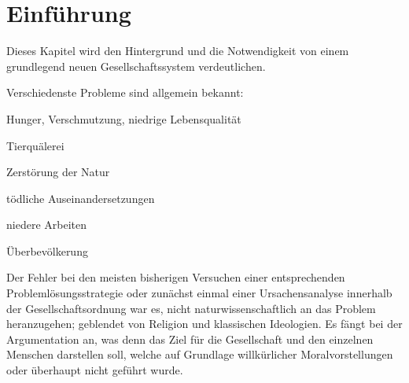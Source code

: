 \chapter{Einführung}\label{chap:introduction}

Dieses Kapitel wird den Hintergrund und die Notwendigkeit von einem grundlegend neuen Gesellschaftssystem verdeutlichen.

Verschiedenste Probleme sind allgemein bekannt:
\medskip
\begin{compactitem}
\item Hunger, Verschmutzung, niedrige Lebensqualität
\item Tierquälerei
\item Zerstörung der Natur
\item tödliche Auseinandersetzungen
\item niedere Arbeiten
\item Überbevölkerung
\end{compactitem}
\medskip

Der Fehler bei den meisten bisherigen Versuchen einer entsprechenden Problemlösungsstrategie oder zunächst einmal einer Ursachensanalyse innerhalb der Gesellschaftsordnung war es, nicht naturwissenschaftlich an das Problem heranzugehen; geblendet von Religion und klassischen Ideologien. Es fängt bei der Argumentation an, was denn das Ziel für die Gesellschaft und den einzelnen Menschen darstellen soll, welche auf Grundlage willkürlicher Moralvorstellungen oder überhaupt nicht geführt wurde.
